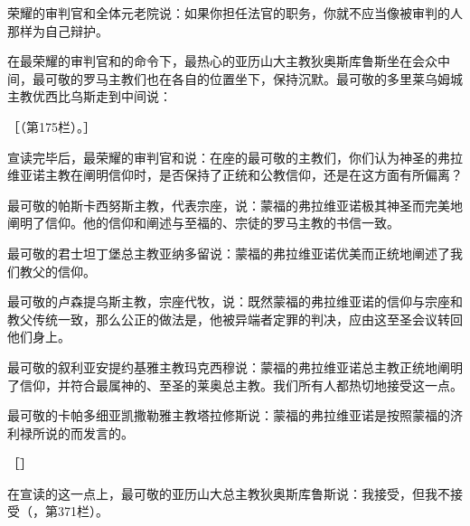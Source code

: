 荣耀的审判官和全体元老院说：如果你担任法官的职务，你就不应当像被审判的人那样为自己辩护。\par

在最荣耀的审判官和的命令下，最热心的亚历山大主教狄奥斯库鲁斯坐在会众中间，最可敬的罗马主教们也在各自的位置坐下，保持沉默。最可敬的多里莱乌姆城主教优西比乌斯走到中间说：\par

［（第175栏）。］\par

宣读完毕后，最荣耀的审判官和说：在座的最可敬的主教们，你们认为神圣的弗拉维亚诺主教在阐明信仰时，是否保持了正统和公教信仰，还是在这方面有所偏离？\par

最可敬的帕斯卡西努斯主教，代表宗座，说：蒙福的弗拉维亚诺极其神圣而完美地阐明了信仰。他的信仰和阐述与至福的、宗徒的罗马主教的书信一致。\par

最可敬的君士坦丁堡总主教亚纳多留说：蒙福的弗拉维亚诺优美而正统地阐述了我们教父的信仰。\par

最可敬的卢森提乌斯主教，宗座代牧，说：既然蒙福的弗拉维亚诺的信仰与宗座和教父传统一致，那么公正的做法是，他被异端者定罪的判决，应由这至圣会议转回他们身上。\par

最可敬的叙利亚安提约基雅主教玛克西穆说：蒙福的弗拉维亚诺总主教正统地阐明了信仰，并符合最属神的、至圣的莱奥总主教。我们所有人都热切地接受这一点。\par

最可敬的卡帕多细亚凯撒勒雅主教塔拉修斯说：蒙福的弗拉维亚诺是按照蒙福的济利禄所说的而发言的。\par

［］\par

在宣读的这一点上，最可敬的亚历山大总主教狄奥斯库鲁斯说：我接受，但我不接受（，第371栏）。\par

